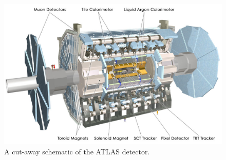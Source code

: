 \begin{figure}[!ht]
  \begin{center}
    \includegraphics[width=1\linewidth, angle=0]{figs/Detector/ATLAS_schem.jpg}
  \end{center}
  \caption{ A cut-away schematic of the ATLAS detector.}
  \label{fig:det-ATLAS_schem}
\end{figure}

